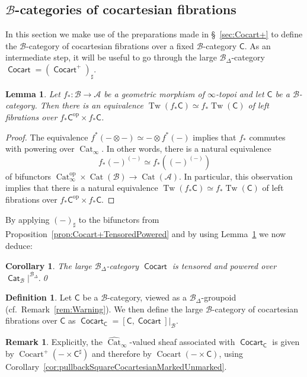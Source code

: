 \documentclass[reqno]{amsart}
\numberwithin{equation}{subsection}
\theoremstyle{plain}
\newtheorem{lemma}[equation]{Lemma}
\newtheorem{corollary}[equation]{Corollary}
\theoremstyle{definition}
\newtheorem{definition}[equation]{Definition}
\newtheorem{remark}[equation]{Remark}
\let\scr=\mathcal
\def\AA{\scr A}
\def\BB{\scr B}
\DeclareMathOperator{\Cat}{Cat}
\DeclareMathOperator{\ICat}{\mathsf{Cat}}
\DeclareMathOperator{\Cocart}{Cocart}
\DeclareMathOperator{\ICocart}{\mathsf{Cocart}}
\DeclareMathOperator{\Tw}{Tw}
\newcommand{\op}{\mathrm{op}}
\newcommand{\I}[1]{\mathsf{#1}}
\newcommand{\iFun}[2]{{[#1,#2]}}
\newcommand{\Simp}[1]{#1_{\Delta}}
\newcommand{\CatS}{\Cat_{\infty}}
\newcommand{\CatSS}{\widehat{\Cat}_\infty}
\begin{document}
\subsection{$\BB$-categories of cocartesian fibrations}
\label{sec:Cocart}
In this section we make use of the preparations made in \S~\ref{sec:Cocart+} to define the $\BB$-category of cocartesian fibrations over a fixed $\BB$-category $\I{C}$. As an intermediate step, it will be useful to go through the large $\Simp\BB$-category $\ICocart=(\ICocart^+)_\sharp$.
\begin{lemma}
	\label{lem:geometricMorphismPowering}
	Let $f_\ast\colon \BB\to \AA$ be a geometric morphism of $\infty$-topoi and let $\I{C}$ be a $\BB$-category. Then there is an equivalence $\Tw(f_\ast\I{C})\simeq f_\ast\Tw(\I{C})$ of left fibrations over $f_\ast\I{C}^{\op}\times f_\ast\I{C}$.
\end{lemma}
\begin{proof}
	The equivalence $f^\ast(-\otimes -)\simeq -\otimes f^\ast(-)$ implies that $f_\ast$ commutes with powering over $\CatS$. In other words, there is a natural equivalence
	\begin{equation*}
		f_\ast(-)^{(-)}\simeq f_\ast((-)^{(-)})
	\end{equation*}
	of bifunctors $\CatS^{\op}\times\Cat(\BB)\to\Cat(\AA)$. In particular, this observation implies that there is a natural equivalence $\Tw(f_\ast\I{C})\simeq f_\ast\Tw(\I{C})$ of left fibrations over $f_\ast\I{C}^{\op}\times f_\ast\I{C}$.
\end{proof}
By applying $(-)_\sharp$ to the bifunctors from Proposition~\ref{prop:Cocart+TensoredPowered} and by using Lemma~\ref{lem:geometricMorphismPowering} we now deduce:
\begin{corollary}
	\label{cor:CocartPoweredTensored}
	The large $\Simp\BB$-category $\ICocart$ is tensored and powered over $\ICat_{\BB}\vert^{\Simp\BB}$.\qed
\end{corollary}

\begin{definition}
	\label{def:categoryOfCocartesianFibrations}
	Let $\I{C}$ be a $\BB$-category, viewed as a $\Simp\BB$-groupoid (cf.~Remark~\ref{rem:Warning}). We then define the large $\BB$-category of cocartesian fibrations over $\I{C}$ as $\ICocart_{\I{C}}=\iFun{\I{C}}{\ICocart}\vert_{\BB}$.
\end{definition}
\begin{remark}
	\label{rem:cocartCUnderlyingSheaf}
	Explicitly, the $\CatSS$-valued sheaf associated with $\ICocart_{\I{C}}$ is given by $\Cocart^+(-\times \I{C}^\sharp)$ and therefore by $\Cocart(-\times \I{C})$, using Corollary~\ref{cor:pullbackSquareCocartesianMarkedUnmarked}.
\end{remark}
\end{document}
